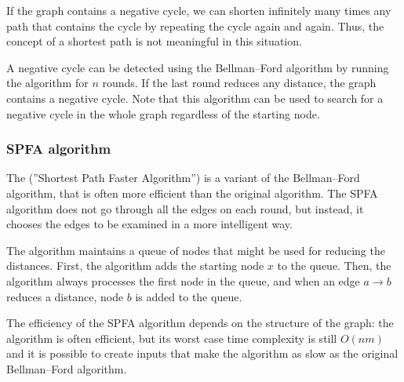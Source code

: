 If the graph contains a negative cycle,
we can shorten infinitely many times
any path that contains the cycle by repeating the cycle
again and again.
Thus, the concept of a shortest path
is not meaningful in this situation.

A negative cycle can be detected
using the Bellman–Ford algorithm by
running the algorithm for $n$ rounds.
If the last round reduces any distance,
the graph contains a negative cycle.
Note that this algorithm can be used to
search for
a negative cycle in the whole graph
regardless of the starting node.

\subsubsection{SPFA algorithm}


The  (''Shortest Path Faster Algorithm'') \cite{fan94}
is a variant of the Bellman–Ford algorithm,
that is often more efficient than the original algorithm.
The SPFA algorithm does not go through all the edges on each round,
but instead, it chooses the edges to be examined
in a more intelligent way.

The algorithm maintains a queue of nodes that might
be used for reducing the distances.
First, the algorithm adds the starting node $x$
to the queue.
Then, the algorithm always processes the
first node in the queue, and when an edge
$a \rightarrow b$ reduces a distance,
node $b$ is added to the queue.
% 
% 

The efficiency of the SPFA algorithm depends
on the structure of the graph:
the algorithm is often efficient,
but its worst case time complexity is still
$O(nm)$ and it is possible to create inputs
that make the algorithm as slow as the
original Bellman–Ford algorithm.

